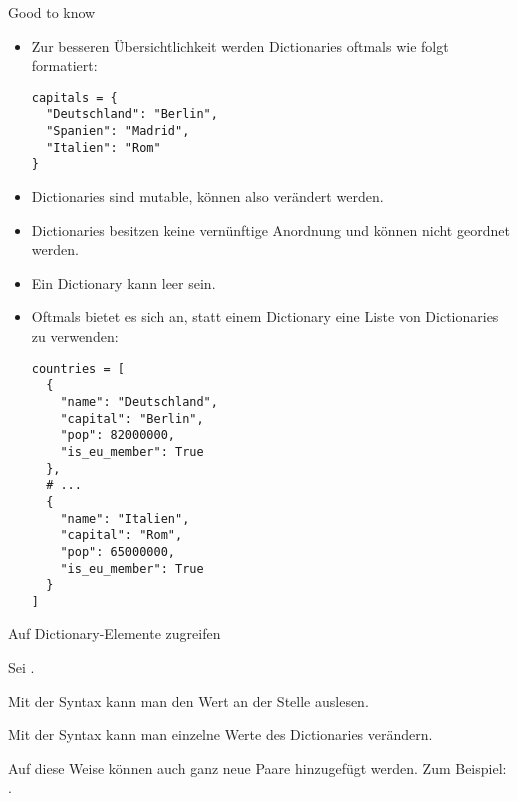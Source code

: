 \begin{fragile}

\begin{block}{Good to know}
	\pause
\begin{itemize}[<+->]
\item Zur besseren Übersichtlichkeit werden Dictionaries oftmals wie folgt formatiert: 
\begin{verbatim}
capitals = { 
  "Deutschland": "Berlin", 
  "Spanien": "Madrid", 
  "Italien": "Rom"
}
\end{verbatim}
\item Dictionaries sind mutable, können also verändert werden. 
\item Dictionaries besitzen keine vernünftige Anordnung und können nicht geordnet werden. 
\item Ein Dictionary kann leer sein. 
\end{itemize}
\end{block}
\end{fragile}

\begin{fragile}
\begin{itemize}
\item Oftmals bietet es sich an, statt einem Dictionary eine Liste von Dictionaries zu verwenden:
\begin{verbatim}
countries = [
  { 
    "name": "Deutschland", 
    "capital": "Berlin",
    "pop": 82000000,
    "is_eu_member": True
  },
  # ... 
  {
    "name": "Italien",
    "capital": "Rom", 
    "pop": 65000000,
    "is_eu_member": True
  }
]
\end{verbatim}
\end{itemize}
\end{fragile}



\begin{frame}


\begin{block}{Auf Dictionary-Elemente zugreifen}
	
	\vspace{2pt}
	
	Sei .
	
	\pause
	
	Mit der Syntax  kann man den Wert an der Stelle  auslesen. 
	
	\pause 
	
	Mit der Syntax  kann  man einzelne Werte des Dictionaries verändern. 
	
	\pause 
	
	Auf diese Weise können auch ganz neue Paare hinzugefügt werden. Zum Beispiel: . 
\end{block}
\end{frame}


